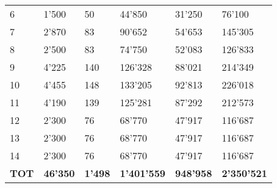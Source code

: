 \begin{table}[h!]
\begin{tabular}{llllll}
6        & 1'500                                                                  & 50          & 44'850                                                          & 31'250          & 76'100    \\
7        & 2'870                                                                  & 83          & 90'652                                                          & 54'653          & 145'305   \\
8        & 2'500                                                                  & 83          & 74'750                                                          & 52'083          & 126'833   \\
9        & 4'225                                                                  & 140         & 126'328                                                         & 88'021          & 214'349   \\
10       & 4'455                                                                  & 148         & 133'205                                                         & 92'813          & 226'018   \\
11       & 4'190                                                                  & 139         & 125'281                                                         & 87'292          & 212'573   \\
12       & 2'300                                                                  & 76          & 68'770                                                          & 47'917          & 116'687   \\
13       & 2'300                                                                  & 76          & 68'770                                                          & 47'917          & 116'687   \\
14       & 2'300                                                                  & 76          & 68'770                                                          & 47'917          & 116'687   \\
\midrule
\textbf{TOT}      & \textbf{46'350}                              & \textbf{1'498}       & \textbf{1'401'559}      & \textbf{948'958}         & \textbf{2'350'521} \\
\bottomrule
\end{tabular}
\end{table}